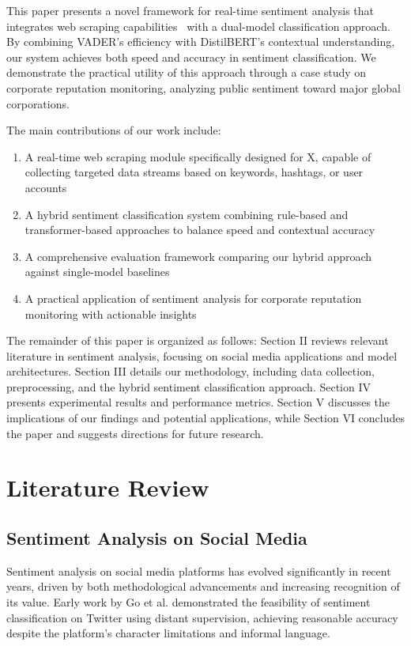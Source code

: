 \documentclass[conference]{IEEEtran}
\begin{document}
This paper presents a novel framework for real-time sentiment analysis that integrates web scraping capabilities~\cite{techrxiv2024scraping} with a dual-model classification approach. By combining VADER's efficiency with DistilBERT's contextual understanding, our system achieves both speed and accuracy in sentiment classification. We demonstrate the practical utility of this approach through a case study on corporate reputation monitoring, analyzing public sentiment toward major global corporations.

The main contributions of our work include:
\begin{enumerate}
    \item A real-time web scraping module specifically designed for X, capable of collecting targeted data streams based on keywords, hashtags, or user accounts~\cite{techrxiv2024scraping}
    \item A hybrid sentiment classification system combining rule-based and transformer-based approaches to balance speed and contextual accuracy~\cite{rahman2024roberta}
    \item A comprehensive evaluation framework comparing our hybrid approach against single-model baselines
    \item A practical application of sentiment analysis for corporate reputation monitoring with actionable insights~\cite{hasselgren2023sp500}
\end{enumerate}

The remainder of this paper is organized as follows: Section II reviews relevant literature in sentiment analysis, focusing on social media applications and model architectures. Section III details our methodology, including data collection, preprocessing, and the hybrid sentiment classification approach. Section IV presents experimental results and performance metrics. Section V discusses the implications of our findings and potential applications, while Section VI concludes the paper and suggests directions for future research.

\section{Literature Review}

\subsection{Sentiment Analysis on Social Media}
Sentiment analysis on social media platforms has evolved significantly in recent years, driven by both methodological advancements and increasing recognition of its value. Early work by Go et al. \cite{go2009twitter} demonstrated the feasibility of sentiment classification on Twitter using distant supervision, achieving reasonable accuracy despite the platform's character limitations and informal language.
\end{document}
